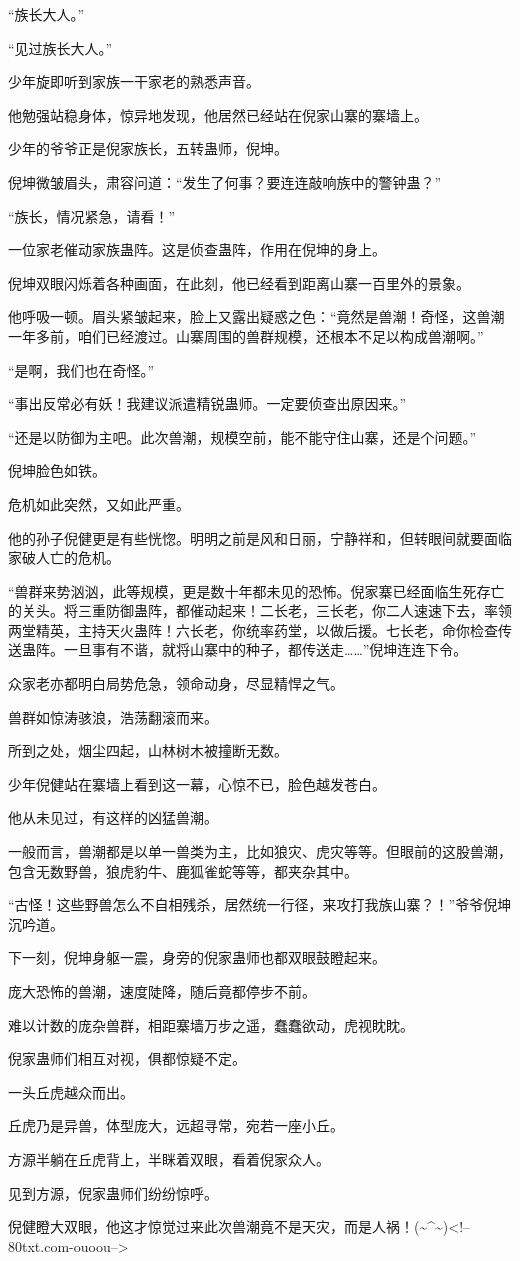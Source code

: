 \begin{this_body}
“族长大人。”

“见过族长大人。”

少年旋即听到家族一干家老的熟悉声音。

他勉强站稳身体，惊异地发现，他居然已经站在倪家山寨的寨墙上。

少年的爷爷正是倪家族长，五转蛊师，倪坤。

倪坤微皱眉头，肃容问道：“发生了何事？要连连敲响族中的警钟蛊？”

“族长，情况紧急，请看！”

一位家老催动家族蛊阵。这是侦查蛊阵，作用在倪坤的身上。

倪坤双眼闪烁着各种画面，在此刻，他已经看到距离山寨一百里外的景象。

他呼吸一顿。眉头紧皱起来，脸上又露出疑惑之色：“竟然是兽潮！奇怪，这兽潮一年多前，咱们已经渡过。山寨周围的兽群规模，还根本不足以构成兽潮啊。”

“是啊，我们也在奇怪。”

“事出反常必有妖！我建议派遣精锐蛊师。一定要侦查出原因来。”

“还是以防御为主吧。此次兽潮，规模空前，能不能守住山寨，还是个问题。”

倪坤脸色如铁。

危机如此突然，又如此严重。

他的孙子倪健更是有些恍惚。明明之前是风和日丽，宁静祥和，但转眼间就要面临家破人亡的危机。

“兽群来势汹汹，此等规模，更是数十年都未见的恐怖。倪家寨已经面临生死存亡的关头。将三重防御蛊阵，都催动起来！二长老，三长老，你二人速速下去，率领两堂精英，主持天火蛊阵！六长老，你统率药堂，以做后援。七长老，命你检查传送蛊阵。一旦事有不谐，就将山寨中的种子，都传送走……”倪坤连连下令。

众家老亦都明白局势危急，领命动身，尽显精悍之气。

兽群如惊涛骇浪，浩荡翻滚而来。

所到之处，烟尘四起，山林树木被撞断无数。

少年倪健站在寨墙上看到这一幕，心惊不已，脸色越发苍白。

他从未见过，有这样的凶猛兽潮。

一般而言，兽潮都是以单一兽类为主，比如狼灾、虎灾等等。但眼前的这股兽潮，包含无数野兽，狼虎豹牛、鹿狐雀蛇等等，都夹杂其中。

“古怪！这些野兽怎么不自相残杀，居然统一行径，来攻打我族山寨？！”爷爷倪坤沉吟道。

下一刻，倪坤身躯一震，身旁的倪家蛊师也都双眼鼓瞪起来。

庞大恐怖的兽潮，速度陡降，随后竟都停步不前。

难以计数的庞杂兽群，相距寨墙万步之遥，蠢蠢欲动，虎视眈眈。

倪家蛊师们相互对视，俱都惊疑不定。

一头丘虎越众而出。

丘虎乃是异兽，体型庞大，远超寻常，宛若一座小丘。

方源半躺在丘虎背上，半眯着双眼，看着倪家众人。

见到方源，倪家蛊师们纷纷惊呼。

倪健瞪大双眼，他这才惊觉过来此次兽潮竟不是天灾，而是人祸！(\~{}\^{}\~{})<!--80txt.com-ouoou-->

\end{this_body}

